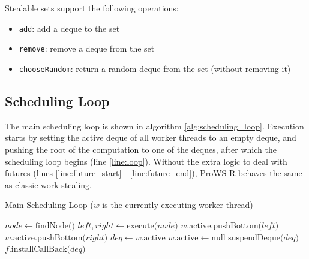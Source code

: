 \documentclass[bsc,frontabs,singlespacing,parskip,deptreport,normalheadings]{infthesis}
\begin{document}
Stealable sets support the following operations:

\begin{itemize}
    \item \texttt{add}: add a deque to the set
    \item \texttt{remove}: remove a deque from the set
    \item \texttt{chooseRandom}: return a random deque from the set (without
        removing it)
\end{itemize}

\subsection{Scheduling Loop}
\label{subsection:scheduling_loop}

The main scheduling loop is shown in algorithm \ref{alg:scheduling_loop}.
Execution starts by setting the active deque of all worker threads to an empty
deque, and pushing the root of the computation to one of the deques, after which
the scheduling loop begins (line \ref{line:loop}).
Without the extra logic to deal with futures (lines \ref{line:future_start} -
\ref{line:future_end}), ProWS-R behaves the same as classic work-stealing.

\begin{algorithm}
\caption{Main Scheduling Loop ($w$ is the currently executing worker thread)}
\label{alg:scheduling_loop}
\begin{algorithmic}[1]
         \label{line:loop}
            \State $node \gets \text{findNode()}$
            \State $left, right \gets \text{execute(}node\text{)}$
                \State $w \text{.active.pushBottom(}left\text{)}$
            \EndIf
                \State $w \text{.active.pushBottom(}right\text{)}$
            \EndIf
            \label{line:future_start} \label{line:blocked_future}
                \State $deq \gets w \text{.active}$
                \State $w \text{.active} \gets \text{null}$
                \State $\text{suspendDeque(}deq\text{)}$
                \State $f\text{.installCallBack(} deq \text{)}$
                    \label{line:install_callback}
            \EndIf \label{line:future_end}
        \EndWhile
    \EndFunction
\end{algorithmic}
\end{algorithm}
\end{document}
